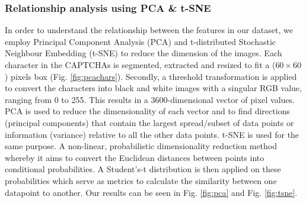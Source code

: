 \documentclass[twocolumn,10pt]{article}
\begin{document}
\subsubsection{Relationship analysis using PCA \& t-SNE}
In order to understand the relationship between the features in our dataset, we employ Principal Component Analysis (PCA) and t-distributed Stochastic Neighbour Embedding (t-SNE) to reduce the dimension of the images. Each character in the CAPTCHAs is segmented, extracted and resized to fit a ($60\times60$) pixels box (Fig. \ref{fig:pcachars}). Secondly, a threshold transformation is applied to convert the characters into black and white images with a singular RGB value, ranging from 0 to 255. This results in a 3600-dimensional vector of pixel values. PCA is used to reduce the dimensionality of each vector and to find directions (principal components) that contain the largest spread/subset of data points or information (variance) relative to all the other data points. t-SNE is used for the same purpose. A non-linear, probabilistic dimensionality reduction method whereby it aims to convert the Euclidean distances between points into conditional probabilities. A Student's-t distribution is then applied on these probabilities which serve as metrics to calculate the similarity between one datapoint to another. Our results can be seen in Fig. \ref{fig:pca} and Fig. \ref{fig:tsne}.
\end{document}
